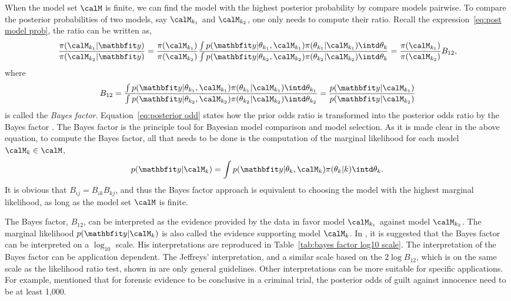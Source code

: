 When the model set $\calM$ is finite, we can find the model with the highest
posterior probability by compare models pairwise. To compare the posterior
probabilities of two models, say $\calM_{k_1}$ and $\calM_{k_2}$, one only
needs to compute their ratio. Recall the expression~\eqref{eq:post model prob},
the ratio can be written as,
\begin{equation}
  \frac{\pi(\calM_{k_1}|\data)}{\pi(\calM_{k_2}|\data)}
  = \frac{\pi(\calM_{k_1})}{\pi(\calM_{k_2})} \frac
  {\int p(\data|\theta_{k_1},\calM_{k_1})\pi(\theta_{k_1}|\calM_{k_1})
      \intd\theta_k}
  {\int p(\data|\theta_{k_2},\calM_{k_2})\pi(\theta_{k_2}|\calM_{k_2})
      \intd\theta_k}
  = \frac{\pi(\calM_{k_1})}{\pi(\calM_{k_2})}B_{12},
  \label{eq:posterior odd}
\end{equation}
where
\begin{equation}
  B_{12} = \frac
  {\int p(\data|\theta_{k_1},\calM_{k_1})\pi(\theta_{k_1}|\calM_{k_1})
      \intd\theta_{k_1}}
  {\int p(\data|\theta_{k_2},\calM_{k_2})\pi(\theta_{k_2}|\calM_{k_2})
      \intd\theta_{k_2}}
    = \frac{p(\data|\calM_{k_1})}{p(\data|\calM_{k_2})}
  \label{eq:bayes factor}
\end{equation}
is called the \emph{Bayes factor}. Equation~\eqref{eq:posterior odd} states
how the prior odds ratio is transformed into the posterior odds ratio by the
Bayes factor \cite{Kass:1995vb}. The Bayes factor is the principle tool for
Bayesian model comparison and model selection. As it is made clear in the
above equation, to compute the Bayes factor, all that needs to be done is the
computation of the marginal likelihood for each model $\calM_k\in\calM$,
\begin{equation}
  p(\data|\calM_k) =
  \int p(\data|\theta_k,\calM_k)\pi(\theta_k|k)\intd\theta_k.
\end{equation}
It is obvious that $B_{ij} = B_{ik} B_{kj}$, and thus the Bayes
factor approach is equivalent to choosing the model with the highest marginal
likelihood, as long as the model set $\calM$ is finite.

The Bayes factor, $B_{12}$, can be interpreted as the evidence provided by the
data in favor model $\calM_{k_1}$ against model $\calM_{k_2}$. The marginal
likelihood $p(\data|\calM_k)$ is also called the evidence supporting model
$\calM_k$. In \cite{Jeffreys:1961ua}, it is suggested that the Bayes factor
can be interpreted on a $\log_{10}$ scale. His interpretations are reproduced
in Table~\ref{tab:bayes factor log10 scale}. The interpretation of the Bayes
factor can be application dependent. The Jeffreys' interpretation, and a
similar scale based on the $2\log B_{12}$, which is on the same scale as the
likelihood ratio test, shown in \cite{Kass:1995vb} are only general
guidelines. Other interpretations can be more suitable for specific
applications. For example, \cite{Kass:1995vb} mentioned that for forensic
evidence to be conclusive in a criminal trial, the posterior odds of guilt
against innocence need to be at least 1,000.

